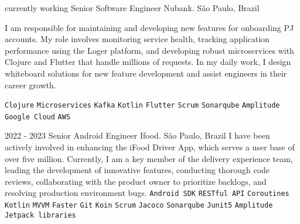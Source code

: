 \documentclass[9pt]{developercv} %
\begin{document}
\begin{entrylist}
	\entry
		{currently working}
		{Senior Software Engineer}
		{Nubank. São Paulo, Brazil}
{
I am responsible for maintaining and developing new features for onboarding PJ accounts. My role involves monitoring service health, tracking application performance using the Loger platform, and developing robust microservices with Clojure and Flutter that handle millions of requests. In my daily work, I design whiteboard solutions for new feature development and assist engineers in their career growth.


 	{
 		\texttt{Clojure}\slashsep
		 \texttt{Microservices}\slashsep
		 \texttt{Kafka}\slashsep
		 \texttt{Kotlin}\slashsep
		 \texttt{Flutter}\slashsep
		 \texttt{Scrum}\slashsep
		 \texttt{Sonarqube}\slashsep
		 \texttt{Amplitude}\slashsep
		 \texttt{Google Cloud}\slashsep
		 \texttt{AWS}\slashsep
	}
}

\end{entrylist}
\begin{entrylist}
	\entry
		{2022 - 2023}
		{Senior Android Engineer}
		{Ifood. São Paulo, Brazil}
{
I have been actively involved in enhancing the iFood Driver App, which serves a user base of over five million. Currently, I am a key member of the delivery experience team, leading the development of innovative features, conducting thorough code reviews, collaborating with the product owner to prioritize backlogs, and resolving production environment bugs.
 	{
 		\texttt{Android SDK}\slashsep
		 \texttt{RESTful API}\slashsep
		 \texttt{Coroutines}\slashsep
		 \texttt{Kotlin}\slashsep
		 \texttt{MVVM}\slashsep
		 \texttt{Faster}\slashsep
		 \texttt{Git}\slashsep
		 \texttt{Koin}\slashsep
		 \texttt{Scrum}\slashsep
		 \texttt{Jacoco}\slashsep
		 \texttt{Sonarqube}\slashsep
		 \texttt{Junit5}\slashsep
		 \texttt{Amplitude}\slashsep
		 \texttt{Jetpack libraries}\slashsep
	}
}

\end{entrylist}
\end{document}
